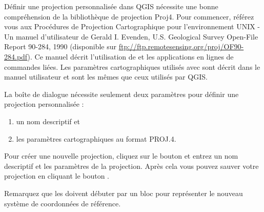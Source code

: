 D\'efinir une projection personnalis\'ee dans QGIS n\'ecessite une bonne
compr\'ehension de la biblioth\`eque de projection Proj4. Pour commencer, r\'ef\'erez
vous aux Proc\'edures de Projection Cartographique pour l'environnement UNIX - Un
manuel d'utilisateur de Gerald I. Evenden, U.S. Geological Survey Open-File
Report 90-284, 1990 (disponible sur
\url{ftp://ftp.remotesensing.org/proj/OF90-284.pdf}).
Ce manuel d\'ecrit l'utilisation de  et les applications en
lignes de commandes li\'ees. Les param\`etres cartographiques utilis\'es avec
 sont d\'ecrit dans le manuel utilisateur et sont les m\^emes que
ceux utilis\'es par QGIS.

La bo\^ite de dialogue  n\'ecessite seulement deux param\`etres pour d\'efinir une
projection personnalis\'ee :
\begin{enumerate}
\item un nom descriptif et
\item les param\`etres cartographiques au format PROJ.4.
\end{enumerate}
Pour cr\'eer une nouvelle projection, cliquez sur le bouton
 et entrez un nom descriptif et les param\`etres de
la projection. Apr\`es cela vous pouvez sauver votre projection en cliquant le
bouton  .

Remarquez que les  doivent d\'ebuter par un
 bloc  pour repr\'esenter le nouveau syst\`eme de coordonn\'ees de
r\'ef\'erence.

